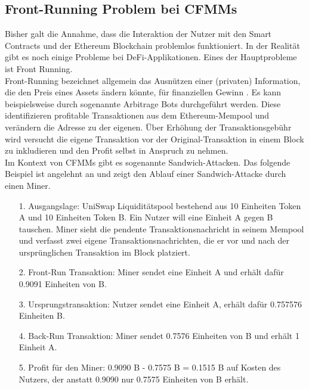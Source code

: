 \documentclass[12pt,a4paper,titlepage,oneside,english]{article}
\begin{document}

\subsection{Front-Running Problem bei CFMMs}
Bisher galt die Annahme, dass die Interaktion der Nutzer mit den Smart Contracts und der Ethereum Blockchain problemlos funktioniert. In der Realität gibt es noch einige Probleme bei DeFi-Applikationen. Eines der Hauptprobleme ist \glqq Front Running\grqq .\\
Front-Running bezeichnet allgemein das Ausnützen einer (privaten) Information, die den Preis eines Assets ändern könnte, für finanziellen Gewinn \citep[S.1]{Zhou2020}.
Es kann beispielsweise durch sogenannte Arbitrage Bots durchgeführt werden. Diese identifizieren profitable Transaktionen aus dem Ethereum-Mempool und verändern die Adresse zu der eigenen. Über Erhöhung der Transaktionsgebühr wird versucht die eigene Transaktion vor der Original-Transaktion in einem Block zu inkludieren und den Profit selbst in Anspruch zu nehmen. \citep{Robinson2020} \\
Im Kontext von CFMMs gibt es sogenannte \glqq Sandwich-Attacken\grqq . Das folgende Beispiel ist angelehnt an \citet{Buterin2018} und zeigt den Ablauf einer Sandwich-Attacke durch einen Miner.
\begin{itemize} \item[1.] Ausgangslage: UniSwap Liquiditätspool bestehend aus 10 Einheiten Token A und 10 Einheiten Token B.  Ein Nutzer will eine Einheit A gegen B tauschen. Miner sieht die pendente Transaktionsnachricht in seinem Mempool und verfasst zwei eigene Transaktionsnachrichten, die er vor und nach der ursprünglichen Transaktion im Block platziert.
	\item[2.] Front-Run Transaktion: Miner sendet eine Einheit A und erhält dafür 0.9091 Einheiten von B.
	\item[3.] Ursprungstransaktion: Nutzer sendet eine Einheit A, erhält dafür 0.757576 Einheiten B.
	\item[4.] Back-Run Transaktion: Miner sendet 0.7576 Einheiten von B und erhält 1 Einheit A.	
	\item[5.] Profit für den Miner: 0.9090 B - 0.7575 B = 0.1515 B auf Kosten des Nutzers, der anstatt 0.9090 nur 0.7575 Einheiten von B erhält.
\end{itemize}
\end{document}

